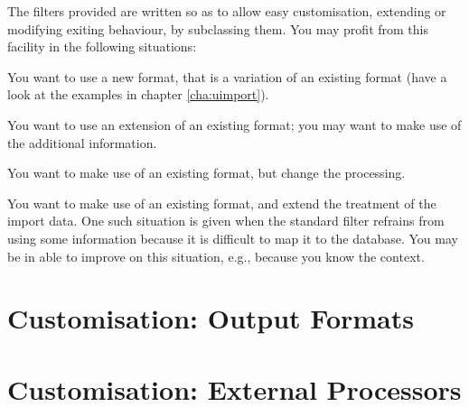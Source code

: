 The filters provided are written so as to allow easy customisation,
extending or modifying exiting behaviour,  by subclassing them. You
may profit from this facility in the following situations:
\begin{itemize*}
\item You want to use a new format, that is a variation of an existing
  format (have a look at the examples in chapter \ref{cha:uimport}).
\item You want to use an extension of an existing format; you may want
  to make use of the additional information.
\item You want to make use of an existing format, but change the
  processing.
\item You want to make use of an existing format, and extend the
  treatment of the import data.  One such situation is given when the
  standard filter refrains from using some information because it is
  difficult to map it to the database.  You may be in able to improve
  on this situation, e.g., because you know the context.
\end{itemize*}



\section{Customisation: Output Formats}
\label{sec:rginstformat}


\section{Customisation: External Processors}
\label{sec:rginstexternal}




